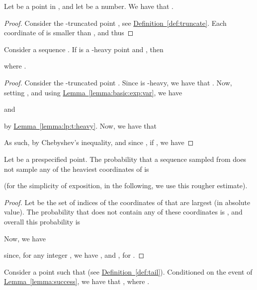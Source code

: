 \documentclass[12pt]{article}\usepackage[cm]{fullpage}
\theoremstyle{remark}\theoremheaderfont{\sf}\theorembodyfont{\upshape}\newtheorem{defn}[theorem]{Definition}
\numberwithin{figure}{section}\numberwithin{table}{section}\numberwithin{equation}{section}
\newcommand{\HLink}[2]{\hyperref[#2]{#1~\ref*{#2}}}
\newcommand{\defref}[1]{\HLink{Definition}{def:#1}}
\newcommand{\lemlab}[1]{\label{lemma:#1}}
\newcommand{\lemref}[1]{\HLink{Lemma}{lemma:#1}}
\begin{document}
\begin{lemma}\lemlab{lp:t:heavy}Let  be a point in , and let  be a
    number.  We have that
    .
\end{lemma}

\begin{proof}
Consider the -truncated point
    , see \defref{truncate}.  Each
    coordinate of  is smaller than , and thus
    
\end{proof}

\begin{lemma}
    \lemlab{lp:heavy:block}Consider a sequence .  If  is a
    -heavy point and
    , then
    
    where .
\end{lemma}
\begin{proof}
    Consider the -truncated point
    .  Since  is
    -heavy, we have that
    .  Now, setting
    , and using
    \lemref{basic:exp:var}, we have
    
    and
    
    by \lemref{lp:t:heavy}.  Now, we have that
    
    As such, by Chebyshev's inequality, and since
    , if , we
    have
    
\end{proof}


\begin{lemma}
    \lemlab{success}Let  be a prespecified point. The probability that a
    sequence  sampled from  does not sample
    any of the  heaviest coordinates of  is
    
    (for the simplicity of exposition, in the following, we use this
    rougher estimate).
\end{lemma}

\begin{proof}
    Let  be the set of  indices of the coordinates of 
    that are largest (in absolute value). The probability that
     does not contain any of these coordinates is
    , and overall this probability is
    
    Now, we have
    
    since, for any integer , we have
    , and
    , for .
\end{proof}


\begin{lemma}
    \lemlab{lp:light:good}Consider a point  such that
     (see
    \defref{tail}). Conditioned on the event of \lemref{success}, we
    have that
    , where .
\end{lemma}
\end{document}
